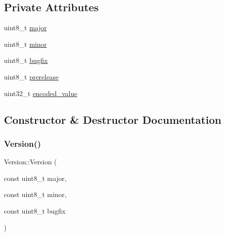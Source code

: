 \subsection*{Private Attributes}
\begin{DoxyCompactItemize}
\item 
uint8\+\_\+t \mbox{\hyperlink{classlucene_1_1core_1_1util_1_1etc_1_1Version_a3dfe19c8cebead3a00ef2d62a7258a2f}{major}}
\item 
uint8\+\_\+t \mbox{\hyperlink{classlucene_1_1core_1_1util_1_1etc_1_1Version_af2b0edc664bfbd88c3beeec7aaf1f5cd}{minor}}
\item 
uint8\+\_\+t \mbox{\hyperlink{classlucene_1_1core_1_1util_1_1etc_1_1Version_ae15ce27ea5edc27bce7a15ec1ba725a4}{bugfix}}
\item 
uint8\+\_\+t \mbox{\hyperlink{classlucene_1_1core_1_1util_1_1etc_1_1Version_aa27ae5fafcfa447563abeb4d1d73ad4f}{prerelease}}
\item 
uint32\+\_\+t \mbox{\hyperlink{classlucene_1_1core_1_1util_1_1etc_1_1Version_a1dcd9038e41028db3f94eb0496aff6c8}{encoded\+\_\+value}}
\end{DoxyCompactItemize}


\subsection{Constructor \& Destructor Documentation}
\mbox{\label{classlucene_1_1core_1_1util_1_1etc_1_1Version_aab6be2fea4aac2881ae89ce58de8adcf}} 
\subsubsection{\texorpdfstring{Version()}{Version()}\hspace{0.1cm}{\footnotesize\ttfamily [1/4]}}
{\footnotesize\ttfamily Version\+::\+Version (\begin{DoxyParamCaption}\item[{const uint8\+\_\+t}]{major,  }\item[{const uint8\+\_\+t}]{minor,  }\item[{const uint8\+\_\+t}]{bugfix }\end{DoxyParamCaption})\hspace{0.3cm}{\ttfamily [private]}}

